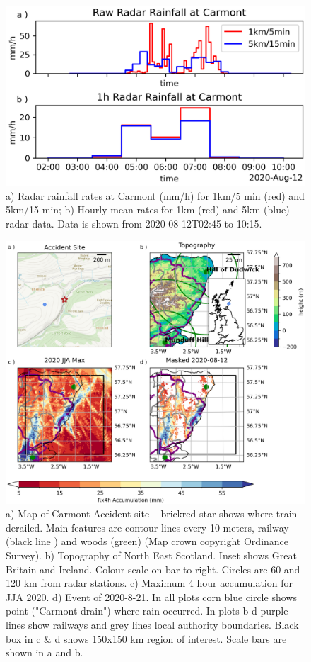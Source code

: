 \documentclass[11pt,a4paper]{article}
\begin{document}
\begin{figure}[tp]
	\centering
	\includegraphics[width=0.5\linewidth]{radar_carmont.png}
	\caption{a) Radar rainfall rates at Carmont (mm/h) for 1km/5 min (red) and 5km/15 min; b) Hourly mean rates for 1km (red) and 5km (blue) radar data. Data is shown from 2020-08-12T02:45 to 10:15. }
	\label{fig:mean_rain}
\end{figure}

\begin{figure}[tp]
	
	\centering
	\includegraphics[width=\linewidth]{carmont_geog_group.png}
	\caption{a) Map of Carmont Accident site -- brickred star shows where train derailed. Main features are contour lines every 10 meters, railway (black line ) and woods (green) (Map crown copyright Ordinance Survey). b) Topography of North East Scotland. Inset shows Great Britain and Ireland. Colour scale on bar to right. Circles are  60 and 120 km from radar stations.  c) Maximum 4 hour accumulation  for JJA 2020. d) Event of 2020-8-21. In all plots  corn blue circle shows point ("Carmont drain") where rain occurred. In plots b-d purple lines show railways and grey lines local authority boundaries. Black box in c \& d shows 150x150 km region of interest. Scale bars are shown in a and b.   }
	\label{fig:carmont_geog_group}
\end{figure}
\end{document}
